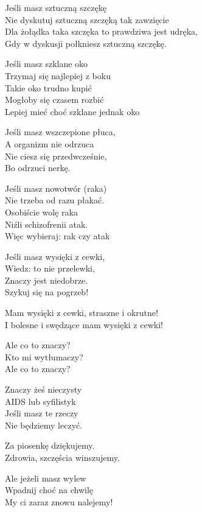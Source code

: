 \begin{text}
    Jeśli masz sztuczną szczękę\\
    Nie dyskutuj sztuczną szczęką tak zawzięcie\\
    Dla żołądka taka szczęka to prawdziwa jest udręka,\\
    Gdy w dyskusji połkniesz sztuczną szczękę.

    Jeśli masz szklane oko\\
    Trzymaj się najlepiej z boku\\
    Takie oko trudno kupić\\
    Mogłoby się czasem rozbić\\
    Lepiej mieć choć szklane jednak oko

    Jeśli masz wszczepione płuca,\\
    A organizm nie odrzuca\\
    Nie ciesz się przedwcześnie,\\
    Bo odrzuci nerkę.

    Jeśli masz nowotwór (raka)\\
    Nie trzeba od razu płakać.\\
    Osobiście wolę raka\\
    Niźli schizofrenii atak.\\
    Więc wybieraj: rak czy atak

    Jeśli masz wysięki z cewki,\\
    Wiedz: to nie przelewki,\\
    Znaczy jest niedobrze.\\
    Szykuj się na pogrzeb!

    Mam wysięki z cewki, straszne i okrutne!\\
    I bolesne i swędzące mam wysięki z cewki!

    Ale co to znaczy?\\
    Kto mi wytłumaczy?\\
    Ale co to znaczy?

    Znaczy żeś nieczysty\\
    AIDS lub syfilistyk\\
    Jeśli masz te rzeczy\\
    Nie będziemy leczyć.

    Za piosenkę dziękujemy.\\
    Zdrowia, szczęścia winszujemy.

    Ale jeżeli masz wylew\\
    Wpadnij choć na chwilę\\
    My ci zaraz znowu nalejemy!
\end{text}
\begin{chord}

\end{chord}